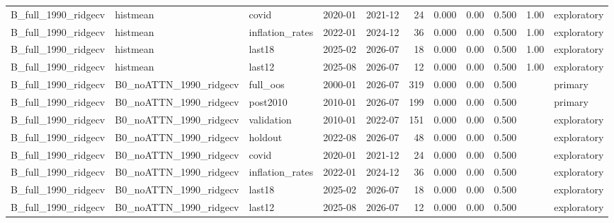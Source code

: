 \begin{table}
\begin{tabular}{lllllrlllll}
B\_full\_1990\_ridgecv & histmean & covid & 2020-01 & 2021-12 & 24 & 0.000 & 0.00 & 0.500 & 1.00 & exploratory \\
B\_full\_1990\_ridgecv & histmean & inflation\_rates & 2022-01 & 2024-12 & 36 & 0.000 & 0.00 & 0.500 & 1.00 & exploratory \\
B\_full\_1990\_ridgecv & histmean & last18 & 2025-02 & 2026-07 & 18 & 0.000 & 0.00 & 0.500 & 1.00 & exploratory \\
B\_full\_1990\_ridgecv & histmean & last12 & 2025-08 & 2026-07 & 12 & 0.000 & 0.00 & 0.500 & 1.00 & exploratory \\
B\_full\_1990\_ridgecv & B0\_noATTN\_1990\_ridgecv & full\_oos & 2000-01 & 2026-07 & 319 & 0.000 & 0.00 & 0.500 &  & primary \\
B\_full\_1990\_ridgecv & B0\_noATTN\_1990\_ridgecv & post2010 & 2010-01 & 2026-07 & 199 & 0.000 & 0.00 & 0.500 &  & primary \\
B\_full\_1990\_ridgecv & B0\_noATTN\_1990\_ridgecv & validation & 2010-01 & 2022-07 & 151 & 0.000 & 0.00 & 0.500 &  & exploratory \\
B\_full\_1990\_ridgecv & B0\_noATTN\_1990\_ridgecv & holdout & 2022-08 & 2026-07 & 48 & 0.000 & 0.00 & 0.500 &  & exploratory \\
B\_full\_1990\_ridgecv & B0\_noATTN\_1990\_ridgecv & covid & 2020-01 & 2021-12 & 24 & 0.000 & 0.00 & 0.500 &  & exploratory \\
B\_full\_1990\_ridgecv & B0\_noATTN\_1990\_ridgecv & inflation\_rates & 2022-01 & 2024-12 & 36 & 0.000 & 0.00 & 0.500 &  & exploratory \\
B\_full\_1990\_ridgecv & B0\_noATTN\_1990\_ridgecv & last18 & 2025-02 & 2026-07 & 18 & 0.000 & 0.00 & 0.500 &  & exploratory \\
B\_full\_1990\_ridgecv & B0\_noATTN\_1990\_ridgecv & last12 & 2025-08 & 2026-07 & 12 & 0.000 & 0.00 & 0.500 &  & exploratory \\
\bottomrule
\end{tabular}
\end{table}
